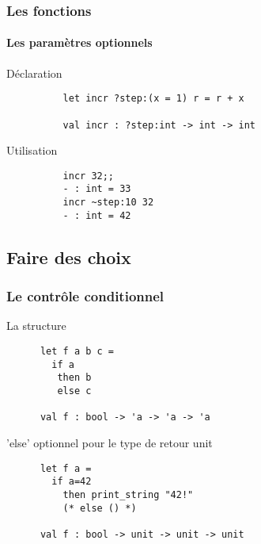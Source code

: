 \begin{frame}[fragile]
	\frametitle{Les fonctions}
	\framesubtitle{Les paramètres optionnels}	

	 	\begin{block}{Déclaration}
		\begin{lstlisting}
		  let incr ?step:(x = 1) r = r + x
		
		  val incr : ?step:int -> int -> int
		\end{lstlisting}
		\end{block}

	 	\begin{block}{Utilisation}
		\begin{lstlisting}
		  incr 32;;
		  - : int = 33
		  incr ~step:10 32
		  - : int = 42
		\end{lstlisting}
		\end{block}

\end{frame}

\subsection{Faire des choix} %
\begin{frame}[fragile]
	\frametitle{Le contrôle conditionnel}
	\begin{block}{La structure}
	\begin{lstlisting}
	  let f a b c =
	    if a
	     then b
	     else c

	  val f : bool -> 'a -> 'a -> 'a
	\end{lstlisting}
	\end{block}
	\begin{block}{'else' optionnel pour le type de retour unit}
	\begin{lstlisting}
	  let f a =
	    if a=42
	      then print_string "42!"
	      (* else () *)

	  val f : bool -> unit -> unit -> unit
	\end{lstlisting}
	\end{block}
\end{frame}

